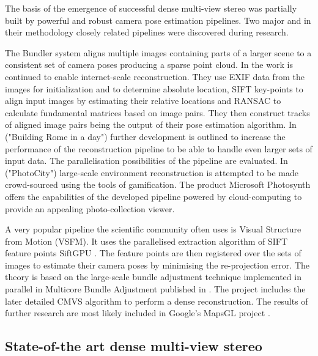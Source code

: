 \documentclass{ucl_thesis}
\begin{document}
The basis of the emergence of successful dense multi-view stereo was partially built by powerful and robust camera pose estimation pipelines. Two major and in their methodology closely related pipelines were discovered during research. 
\par The Bundler \cite{SnavelySS06} system aligns multiple images containing parts of a larger scene to a consistent set of camera poses producing a sparse point cloud. In \cite{SNAVELY-IJCV08} the work is continued to enable internet-scale reconstruction. They use EXIF data from the images for initialization and to determine absolute location, SIFT key-points \cite{Lowe04} to align input images by estimating their relative locations and RANSAC \cite{fischler1981random} to calculate fundamental matrices based on image pairs. They then construct tracks of aligned image pairs being the output of their pose estimation algorithm. 
In \cite{AgarwalFSSCSS11} ("Building Rome in a day") further development is outlined to increase the performance of the reconstruction pipeline to be able to handle even larger sets of input data. The parallelisation possibilities of the pipeline are evaluated. In \cite{Tuite:2011:PTE:1978942.1979146}  ("PhotoCity") large-scale environment reconstruction is attempted to be made crowd-sourced using the tools of gamification. The product Microsoft Photosynth \cite{Photosynth} offers the capabilities of the developed pipeline powered by cloud-computing to provide an appealing photo-collection viewer. \\

\par A very popular pipeline the scientific community often uses is Visual Structure from Motion (VSFM). It uses the parallelised extraction algorithm of SIFT feature points SiftGPU \cite{siftgpu07wu}. The feature points are then registered over the sets of images to estimate their camera poses by minimising the re-projection error. The theory is based on the large-scale bundle adjustment technique \cite{agarwal2010bundle} implemented in parallel in Multicore Bundle Adjustment published in \cite{CWu11}. The project includes the later detailed CMVS \cite{FurukawaCSS10} algorithm to perform a dense reconstruction. The results of further research are most likely included in Google's MapsGL project \cite{MGL}.

\subsection{State-of-the art dense multi-view stereo} 
\label{sotadense}
\end{document}
